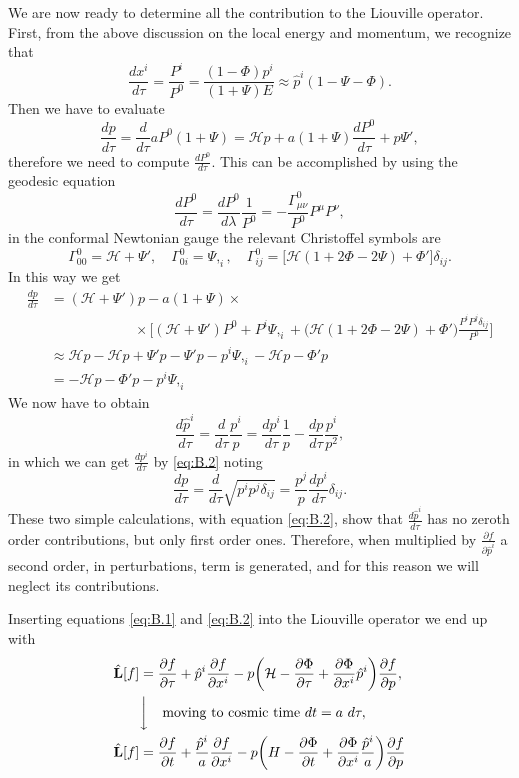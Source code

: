 We are now ready to determine all the contribution to the Liouville operator. First, from the above discussion on the local energy and momentum, we recognize that 
\begin{equation}\label{eq:B.1}
    \frac{dx^i}{d\tau}=\frac{P^i}{P^0}=\frac{(1-\Phi)p^i}{(1+\Psi)E}\approx \hat p^i(1-\Psi-\Phi).
\end{equation}
Then we have to evaluate $$\frac{dp}{d\tau}=\frac{d}{d\tau}aP^0(1+\Psi)=\mathcal{H}p+a(1+\Psi)\frac{dP^0}{d\tau}+p\Psi',$$
therefore we need to compute $\frac{dP^0}{d\tau}$. This can be accomplished by using the geodesic equation $$ \frac{dP^0}{d\tau}=\frac{dP^0}{d\lambda}\frac{1}{P^0}=-\frac{\Gamma^0_{\mu\nu}}{P^0}P^\mu P^\nu,$$
in the conformal Newtonian gauge the relevant Christoffel symbols are $$\Gamma^0_{00}=\mathcal{H}+\Psi',\quad\Gamma^0_{0i}=\Psi,_i,\quad\Gamma^0_{ij}=\bigg[\mathcal{H}(1+2\Phi-2\Psi)+\Phi' \bigg]\delta_{ij}.$$
In this way we get
\begin{align}\label{eq:B.2}
    \frac{dp}{d\tau}&=(\mathcal{H}+\Psi') p-a(1+\Psi)\times\nonumber\\&\qquad\qquad\qquad\times \bigg[(\mathcal{H} +\Psi')P^0+P^i\Psi,_i+\big(\mathcal{H}(1+2\Phi-2\Psi)+\Phi' \big)\frac{P^iP^j\delta_{ij}}{P^0} \bigg]\nonumber\\
    &\approx\mathcal{H} p-\mathcal{H} p+\Psi'p-\Psi'p-p^i\Psi,_i-\mathcal{H}p-\Phi'p\nonumber\\
    &=-\mathcal{H} p-\Phi' p-p^i\Psi,_i
\end{align}
We now have to obtain
$$\frac{d\hat p^i}{d\tau}=\frac{d}{d\tau}\frac{p^i}{p}=\frac{dp^i}{d\tau}\frac{1}{p}-\frac{dp}{d\tau}\frac{p^i}{p^2},$$
in which we can get $\frac{dp^i}{d\tau}$ by \eqref{eq:B.2} noting
$$\frac{dp}{d\tau}=\frac{d}{d\tau}\sqrt{p^ip^j\delta_{ij}}=\frac{p^j}{p}\frac{dp^i}{d\tau}\delta_{ij}.$$
These two simple calculations, with equation \eqref{eq:B.2}, show that $\frac{d\hat p^i}{d\tau}$ has no zeroth order contributions, but only first order ones. Therefore, when multiplied by $\frac{\partial f}{\partial \hat p^i}$ a second order, in perturbations, term is generated, and for this reason we will neglect its contributions.

Inserting equations \eqref{eq:B.1} and \eqref{eq:B.2} into the Liouville operator we end up with
\begin{align}\label{eq:Liouville_scalar_perturbed}
    \hat{\mathbf{L}}[f]&=\frac{\partial f}{\partial \tau}+\hat p^i\frac{\partial f}{\partial x^i}-p\bigg(\mathcal{H}-\frac{\partial \Phi}{\partial \tau}+\frac{\partial \Phi}{\partial x^i}\hat p^i\bigg)\frac{\partial f}{\partial p},\nonumber\\
    &\bigg\downarrow\quad\text{moving to cosmic time } dt=a\ d\tau,\nonumber\\
    \hat{\mathbf{L}}[f]&=\frac{\partial f}{\partial t}+\frac{\hat p^i}{a}\frac{\partial f}{\partial x^i}-p\bigg(H-\frac{\partial \Phi}{\partial t}+\frac{\partial \Phi}{\partial x^i}\frac{\hat p^i}{a}\bigg)\frac{\partial f}{\partial p}
\end{align}
